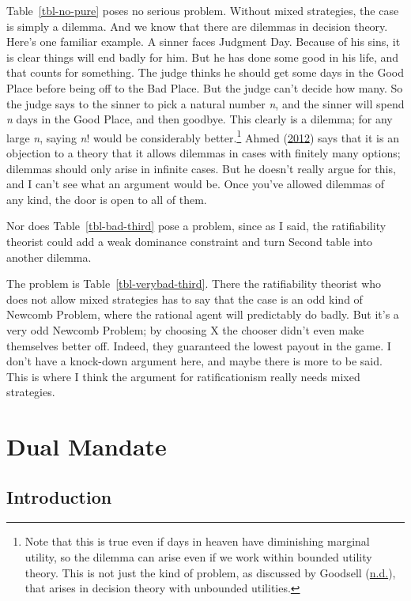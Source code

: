 \documentclass[
  12pt,
  letterpaper,
  DIV=11,
  numbers=noendperiod]{scrreprt}
\begin{document}
Table~\ref{tbl-no-pure} poses no serious problem. Without mixed
strategies, the case is simply a dilemma. And we know that there are
dilemmas in decision theory. Here's one familiar example. A sinner faces
Judgment Day. Because of his sins, it is clear things will end badly for
him. But he has done some good in his life, and that counts for
something. The judge thinks he should get some days in the Good Place
before being off to the Bad Place. But the judge can't decide how many.
So the judge says to the sinner to pick a natural number \emph{n}, and
the sinner will spend \emph{n} days in the Good Place, and then goodbye.
This clearly is a dilemma; for any large \emph{n}, saying \emph{n}!
would be considerably better.\footnote{Note that this is true even if
  days in heaven have diminishing marginal utility, so the dilemma can
  arise even if we work within bounded utility theory. This is not just
  the kind of problem, as discussed by Goodsell
  (\protect\hyperlink{ref-Goodsellnd}{n.d.}), that arises in decision
  theory with unbounded utilities.} Ahmed
(\protect\hyperlink{ref-Ahmed2012}{2012}) says that it is an objection
to a theory that it allows dilemmas in cases with finitely many options;
dilemmas should only arise in infinite cases. But he doesn't really
argue for this, and I can't see what an argument would be. Once you've
allowed dilemmas of any kind, the door is open to all of them.

Nor does Table~\ref{tbl-bad-third} pose a problem, since as I said, the
ratifiability theorist could add a weak dominance constraint and turn
Second table into another dilemma.

The problem is Table~\ref{tbl-verybad-third}. There the ratifiability
theorist who does not allow mixed strategies has to say that the case is
an odd kind of Newcomb Problem, where the rational agent will
predictably do badly. But it's a very odd Newcomb Problem; by choosing X
the chooser didn't even make themselves better off. Indeed, they
guaranteed the lowest payout in the game. I don't have a knock-down
argument here, and maybe there is more to be said. This is where I think
the argument for ratificationism really needs mixed strategies.


\hypertarget{sec-dual}{%
\chapter{Dual Mandate}\label{sec-dual}}

\hypertarget{sec-dual-introduction}{%
\section{Introduction}\label{sec-dual-introduction}}
\end{document}
